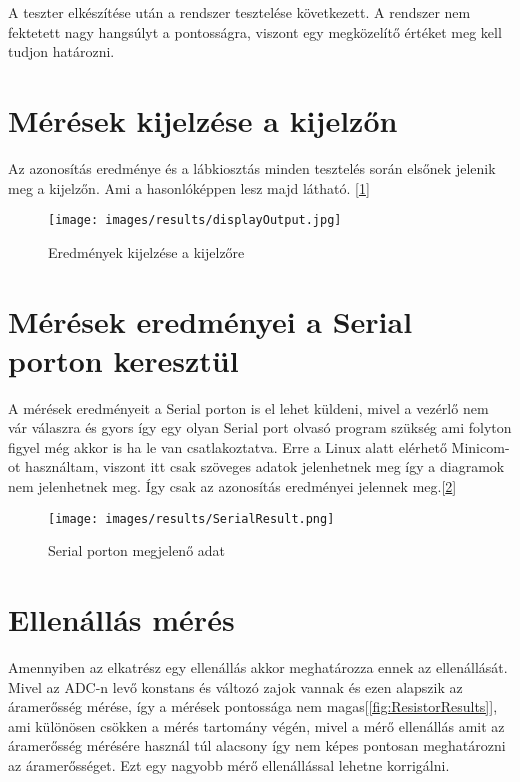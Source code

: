 A teszter elkészítése után a rendszer tesztelése következett.
A rendszer nem fektetett nagy hangsúlyt a pontosságra, viszont egy 
megközelítő értéket meg kell tudjon határozni.

\section{Mérések kijelzése a kijelzőn}

Az azonosítás eredménye és a lábkiosztás minden tesztelés során
elsőnek jelenik meg a kijelzőn. Ami a hasonlóképpen lesz majd látható.
[\ref{fig:displayOutput}]


\begin{figure}[H]
    \centering
    \texttt{[image: images/results/displayOutput.jpg]}
    \caption{Eredmények kijelzése a kijelzőre}
    \label{fig:displayOutput}
\end{figure}

\section{Mérések eredményei a Serial porton keresztül}

A mérések eredményeit a Serial porton is el lehet küldeni, mivel a 
vezérlő nem vár válaszra és gyors így egy olyan Serial port olvasó program
szükség ami folyton figyel még akkor is ha le van csatlakoztatva.
Erre a Linux alatt elérhető Minicom-ot használtam, viszont itt csak 
szöveges adatok jelenhetnek meg így a diagramok nem jelenhetnek meg.
Így csak az azonosítás eredményei jelennek meg.[\ref{fig:SerialRes}]


\begin{figure}[H]
    \centering
    \texttt{[image: images/results/SerialResult.png]}
    \caption{Serial porton megjelenő adat}
    \label{fig:SerialRes}
\end{figure}


\section{Ellenállás mérés}

Amennyiben az elkatrész egy ellenállás akkor meghatározza ennek az ellenállását.
Mivel az ADC-n levő konstans és változó zajok vannak és ezen alapszik 
az áramerősség mérése, így a mérések pontossága nem magas[\ref{fig:ResistorResults}], ami különösen csökken a mérés tartomány
végén, mivel a mérő ellenállás amit az áramerősség mérésére használ túl alacsony így
nem képes pontosan meghatározni az áramerősséget. Ezt egy nagyobb mérő ellenállással
lehetne korrigálni.


